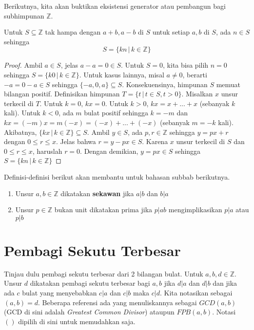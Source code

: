 	Berikutnya, kita akan buktikan eksistensi generator atau pembangun bagi subhimpunan $\mathbb{Z}$.
	\begin{theorem}
		Untuk $S \subseteq \mathbb{Z}$ tak hampa dengan $a + b, a - b$ di $S$ untuk setiap $a,b$ di $S$, ada $n \in S$ sehingga $$S = \{kn \, | \, k \in \mathbb{Z}\}$$
	\end{theorem}
	\begin{proof}
		Ambil $a \in S$, jelas $a-a = 0 \in S$. Untuk $S = {0}$, kita bisa pilih $n = 0$ sehingga $S = \{k0 \, | \, k \in \mathbb{Z} \}$. Untuk kasus lainnya, misal $a \ne 0$, berarti $-a = 0 - a \in S$ sehingga $\{-a, 0, a\} \subseteq S$. Konsekuensinya, himpunan $S$ memuat bilangan positif. Definisikan himpunan $T = \{ t \, | \, t \in S, t > 0 \}$. Misalkan $x$ unsur terkecil di $T$. Untuk $k = 0$, $kx = 0$. Untuk $k > 0$, $kx = x + ... + x$ (sebanyak $k$ kali). Untuk $k < 0$, ada $m$ bulat positif sehingga $k = -m$ dan $kx = (-m)x = m(-x) = (-x) + ... + (-x)$ (sebanyak $m = -k$ kali). Akibatnya, $\{ kx \, | \, k \in \mathbb{Z} \} \subseteq S$. Ambil $y \in S$, ada $p,r \in \mathbb{Z}$ sehingga $y = px + r$ dengan $0 \le r \le x$. Jelas bahwa $r = y - px \in S$. Karena $x$ unsur terkecil di $S$ dan $0 \le r \le x$, haruslah $r = 0$. Dengan demikian, $y = px \in S$ sehingga $S = \{kn \, | \, k \in \mathbb{Z}\} $
	\end{proof}
	Definisi-definisi berikut akan membantu untuk bahasan subbab berikutnya.
	\\
	\begin{enumerate}
		\item Unsur $a,b \in \mathbb{Z}$ dikatakan \textbf{sekawan} jika $a|b$ dan $b|a$
		\item Unsur $p \in \mathbb{Z}$ bukan unit dikatakan prima jika $p | ab$ mengimplikasikan $p | a$ atau $p | b$
	\end{enumerate}
	\section{Pembagi Sekutu Terbesar}
	Tinjau dulu pembagi sekutu terbesar dari 2 bilangan bulat. Untuk $a,b,d \in \mathbb{Z}$. Unsur $d$ dikatakan pembagi sekutu terbesar bagi $a,b$ jika $d | a$ dan $d|b$ dan jika ada $c$ bulat yang menyebabkan $c | a$ dan $c | b$ maka $c | d$. Kita notasikan sebagai $(a,b) = d$. Beberapa referensi ada yang menuliskannya sebagai $GCD(a,b)$ (GCD di sini adalah \textit{Greatest Common Divisor}) ataupun $FPB(a,b)$. Notasi $()$ dipilih di sini untuk memudahkan saja.\\
	
